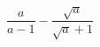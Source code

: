 \begin{ex}[type=expression]
	\begin{condition}
		\( \dfrac{a}{a-1}-\dfrac{\sqrt{a}}{\sqrt{a}+1} \)
	\end{condition}
\end{ex}
